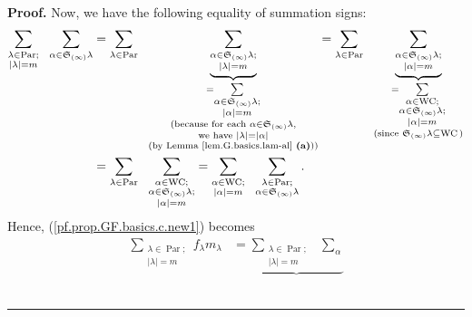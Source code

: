 \documentclass[numbers=enddot,12pt,final,onecolumn,notitlepage]{scrartcl}%
\theoremstyle{definition}
\newenvironment{proof}[1][Proof]{\noindent\textbf{#1.} }{\ \rule{0.5em}{0.5em}}
\let\sumnonlimits\sum
\renewcommand{\sum}{\sumnonlimits\limits}
\newenvironment{verlong}{}{}
\begin{document}
\begin{verlong}
\begin{proof}
Now, we have the following equality of summation signs:%
\begin{align*}
\sum_{\substack{\lambda\in\operatorname*{Par};\\\left\vert \lambda\right\vert
=m}}\ \ \sum_{\alpha\in\mathfrak{S}_{\left(  \infty\right)  }\lambda}  &
=\sum_{\lambda\in\operatorname*{Par}}\ \ \underbrace{\sum_{\substack{\alpha
\in\mathfrak{S}_{\left(  \infty\right)  }\lambda;\\\left\vert \lambda
\right\vert =m}}}_{\substack{=\sum_{\substack{\alpha\in\mathfrak{S}_{\left(
\infty\right)  }\lambda;\\\left\vert \alpha\right\vert =m}}\\\text{(because
for each }\alpha\in\mathfrak{S}_{\left(  \infty\right)  }\lambda
\text{,}\\\text{we have }\left\vert \lambda\right\vert =\left\vert
\alpha\right\vert \\\text{(by Lemma \ref{lem.G.basics.lam-al} \textbf{(a)}))}%
}}=\sum_{\lambda\in\operatorname*{Par}}\ \ \underbrace{\sum_{\substack{\alpha
\in\mathfrak{S}_{\left(  \infty\right)  }\lambda;\\\left\vert \alpha
\right\vert =m}}}_{\substack{=\sum_{\substack{\alpha\in\operatorname*{WC}%
;\\\alpha\in\mathfrak{S}_{\left(  \infty\right)  }\lambda;\\\left\vert
\alpha\right\vert =m}}\\\text{(since }\mathfrak{S}_{\left(  \infty\right)
}\lambda\subseteq\operatorname*{WC}\text{)}}}\\
&  =\sum_{\lambda\in\operatorname*{Par}}\ \ \sum_{\substack{\alpha
\in\operatorname*{WC};\\\alpha\in\mathfrak{S}_{\left(  \infty\right)  }%
\lambda;\\\left\vert \alpha\right\vert =m}}=\sum_{\substack{\alpha
\in\operatorname*{WC};\\\left\vert \alpha\right\vert =m}}\ \ \sum
_{\substack{\lambda\in\operatorname*{Par};\\\alpha\in\mathfrak{S}_{\left(
\infty\right)  }\lambda}}.
\end{align*}
Hence, (\ref{pf.prop.GF.basics.c.new1}) becomes%
\begin{align}
\sum_{\substack{\lambda\in\operatorname*{Par};\\\left\vert \lambda\right\vert
=m}}f_{\lambda}m_{\lambda}  &  =\underbrace{\sum_{\substack{\lambda
\in\operatorname*{Par};\\\left\vert \lambda\right\vert =m}}\ \ \sum_{\alpha
}}
\end{align}
\end{proof}
\end{verlong}
\end{document}
